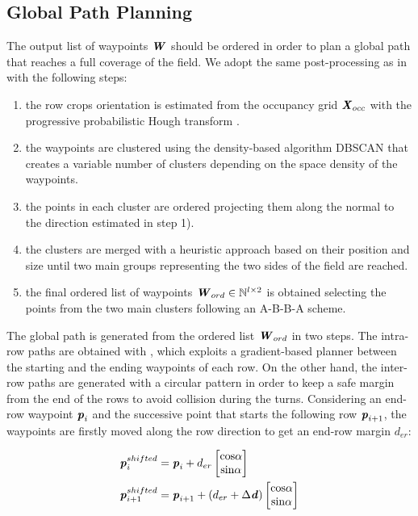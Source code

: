 \documentclass[journal]{IEEEtran}
\begin{document}
\subsection{Global Path Planning}
\label{sec:global_path_planning}
The output list of waypoints ${\textbf{\emph{W}}}$ should be ordered in order to plan a global path that reaches a full coverage of the field. We adopt the same post-processing as in \cite{mazzia2021deepway} with the following steps:

\begin{enumerate}
    \item the row crops orientation is estimated from the occupancy grid $\textbf{\textit{X}}_{occ}$ with the progressive probabilistic Hough transform \cite{matas2000robust}.
    \item the waypoints are clustered using the density-based algorithm DBSCAN\cite{ester1996density} that creates a variable number of clusters depending on the space density of the waypoints.
    \item the points in each cluster are ordered projecting them along the normal to the direction estimated in step 1).
    \item the clusters are merged with a heuristic approach based on their position and size until two main groups representing the two sides of the field are reached.
    \item the final ordered list of waypoints $\textbf{\emph{W}}_{ord} \in \mathbb{N}^{l\times 2}$ is obtained selecting the points from the two main clusters following an A-B-B-A scheme.
\end{enumerate}

The global path is generated from the ordered list $\textbf{\emph{W}}_{ord}$ in two steps. The intra-row paths are obtained with \cite{cerrato2021adaptive}, which exploits a gradient-based planner between the starting and the ending waypoints of each row. On the other hand, the inter-row paths are generated with a circular pattern in order to keep a safe margin from the end of the rows to avoid collision during the turns. Considering an end-row waypoint $\textbf{\textit{p}}_i$ and the successive point that starts the following row $\textbf{\textit{p}}_{i+1}$, the waypoints are firstly moved along the row direction to get an end-row margin $d_{er}$:

\begin{equation}
\begin{split}
    \textbf{\textit{p}}_i^{shifted} &= \textbf{\textit{p}}_i + d_{er} \begin{bmatrix} \text{cos}\alpha\\ \text{sin}\alpha\end{bmatrix}\\
    \textbf{\textit{p}}_{i+1}^{shifted} &= \textbf{\textit{p}}_{i+1} + (d_{er} + \Delta \textbf{\textit{d}})\begin{bmatrix} \text{cos}\alpha\\ \text{sin}\alpha\end{bmatrix} 
\end{split}
\end{equation}
\end{document}
